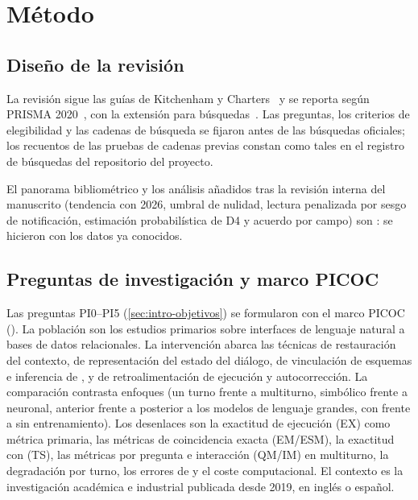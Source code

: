 \section{Método}
\label{sec:metodo}

\subsection{Diseño de la revisión}
\label{sec:met-protocolo}

La revisión sigue las guías de Kitchenham y Charters~\cite{Kitchenham2007Guidelines} y se reporta según PRISMA 2020~\cite{Page2021PRISMA}, con la extensión para búsquedas~\cite{Rethlefsen2021PRISMAS}. Las preguntas, los criterios de elegibilidad y las cadenas de búsqueda se fijaron antes de las búsquedas oficiales; los recuentos de las pruebas de cadenas previas constan como tales en el registro de búsquedas del repositorio del proyecto.

El panorama bibliométrico y los análisis añadidos tras la revisión interna del manuscrito (tendencia con 2026, umbral de nulidad, lectura penalizada por sesgo de notificación, estimación probabilística de D4 y acuerdo por campo) son : se hicieron con los datos ya conocidos.

\subsection{Preguntas de investigación y marco PICOC}
\label{sec:met-picoc}

Las preguntas PI0–PI5 (\cref{sec:intro-objetivos}) se formularon con el marco PICOC (). La población son los estudios primarios sobre interfaces de lenguaje natural a bases de datos relacionales. La intervención abarca las técnicas de restauración del contexto, de representación del estado del diálogo, de vinculación de esquemas e inferencia de , y de retroalimentación de ejecución y autocorrección. La comparación contrasta enfoques (un turno frente a multiturno, simbólico frente a neuronal, anterior frente a posterior a los modelos de lenguaje grandes, con frente a sin entrenamiento). Los desenlaces son la exactitud de ejecución (EX) como métrica primaria, las métricas de coincidencia exacta (EM/ESM), la exactitud con  (TS), las métricas por pregunta e interacción (QM/IM) en multiturno, la degradación por turno, los errores de  y el coste computacional. El contexto es la investigación académica e industrial publicada desde 2019, en inglés o español.

